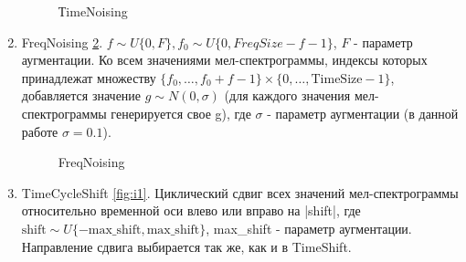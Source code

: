 \documentclass[12pt, fleqn]{article}
\begin{document}
\begin{enumerate}
\begin{figure}[h]
			\caption{ТimeNoising}
			\label{fig:i11}
		\end{figure}
		\item FreqNoising \ref{fig:i12}. \newline
		$f \sim U\{0, F\}, f_0 \sim U\{0, FreqSize - f - 1\}$, $F$ - параметр аугментации. \newline Ко всем  значениями мел-спектрограммы, индексы которых принадлежат множеству $\{f_0, \ldots, f_0 + f - 1\} \times \{0, \ldots, \text{TimeSize} - 1\}$, добавляется значение \newline $g \sim N(0, \sigma)$ (для каждого значения мел-спектрограммы генерируется свое g), где $\sigma$ - параметр аугментации (в данной работе $\sigma = 0.1$).
		\begin{figure}[h]
			\caption{FreqNoising}
			\label{fig:i12}
		\end{figure}
		\item TimeCycleShift \ref{fig:i1}. \newline
		Циклический сдвиг всех значений мел-спектрограммы относительно временной оси влево или вправо на |shift|, где $\text{shift} \sim U\{-\text{max\_shift}, \text{max\_shift}\}$, max\_shift - параметр аугментации. Направление сдвига выбирается так же, как и в TimeShift.  
		\begin{figure}[h]

\end{figure}
\end{enumerate}
\end{document}
